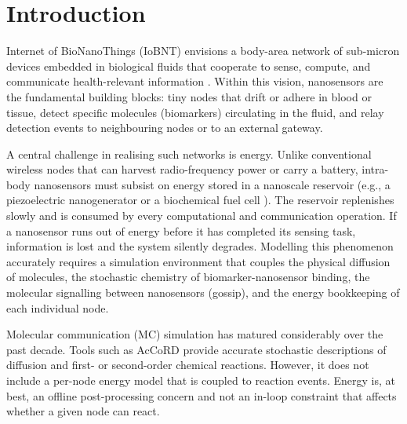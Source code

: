 \documentclass[journal]{IEEEtran}
\begin{document}
\IEEEpeerreviewmaketitle

\section{Introduction}
\label{sec:intro}

 Internet of BioNanoThings (IoBNT) envisions a body-area
network of sub-micron devices embedded in biological fluids that cooperate to
sense, compute, and communicate health-relevant information \cite{akyildiz2015internet}.
Within this vision, nanosensors are the fundamental building blocks: tiny nodes
that drift or adhere in blood or tissue, detect specific molecules (biomarkers)
circulating in the fluid, and relay detection events to neighbouring nodes or
to an external gateway.

A central challenge in realising such networks is energy. Unlike conventional
wireless nodes that can harvest radio-frequency power or carry a battery,
intra-body nanosensors must subsist on energy stored in a nanoscale reservoir
(e.g., a piezoelectric nanogenerator or a biochemical fuel cell
\cite{jornet2012nano}). The reservoir replenishes slowly and is consumed by
every computational and communication operation. If a nanosensor runs out of
energy before it has completed its sensing task, information is lost and the
system silently degrades. Modelling this phenomenon accurately requires a
simulation environment that couples the physical diffusion of molecules, the
stochastic chemistry of biomarker-nanosensor binding, the molecular signalling
between nanosensors (gossip), and the energy bookkeeping of each individual node.

Molecular communication (MC) simulation has matured considerably over the past
decade. Tools such as AcCoRD \cite{noel2017accord} provide accurate stochastic descriptions of diffusion
and first- or second-order chemical reactions. However,
it does not include a per-node energy model that is coupled to
reaction events. Energy is, at best, an offline post-processing concern and
not an in-loop constraint that affects whether a given node can react.
\end{document}
